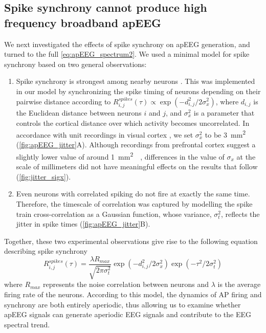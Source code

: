 \subsection{Spike synchrony cannot produce high frequency broadband apEEG}
We next investigated the effects of spike synchrony on apEEG generation, and turned to the full \ref{eq:apEEG_spectrum2}. We used a minimal model for spike synchrony based on two general observations:
\begin{enumerate}
\item Spike synchrony is strongest among nearby neurons \cite{Smith2008, Smith2013, Cohen2011}. This was implemented in our model by synchronizing the spike timing of neurons depending on their pairwise distance according to $R^{spikes}_{i,j}(\tau) \propto \exp(-d_{i,j}^2 / 2\sigma_x^2)$, where $d_{i,j}$ is the Euclidean distance between neurons $i$ and $j$, and $\sigma_x^2$ is a parameter that controls the cortical distance over which activity becomes uncorrelated. In accordance with unit recordings in visual cortex \cite{Smith2008, Smith2013}, we set $\sigma_x^2$ to be 3~\unit{\milli\meter^2}  ({\autoref{fig:apEEG_jitter}A}). Although recordings from prefrontal cortex suggest a slightly lower value of around 1~\unit{\milli\meter^2}~~\cite{Constantinidis2002},  differences in the value of $\sigma_x$ at the scale of millimeters did not have meaningful effects on the results that follow ({\autoref{fig:jitter_sigx}}).
\item Even neurons with correlated spiking do not fire at exactly the same time. Therefore, the timescale of correlation was captured by modelling the spike train cross-correlation as a Gaussian function, whose variance, $\sigma_t^2$, reflects the jitter in spike times  \cite{Bair2001, Smith2008, Smith2013, Cohen2011} ({\autoref{fig:apEEG_jitter}B}). 
\end{enumerate}
Together, these two experimental observations give rise to the following equation describing spike synchrony
\begin{equation} \label{eq:aperiodic_cross_correlation}
    R^{spikes}_{i,j}(\tau) = \frac{\lambda R_{max}}{\sqrt{2\pi \sigma_t^2}} \exp(-d_{i,j}^2 / 2\sigma_x^2) \exp(-\tau^2/2\sigma_t^2)
\end{equation} 
where $R_{max}$ represents the noise correlation between neurons \cite{Bair2001} and $\lambda$ is the average firing rate of the neurons. According to this model, the dynamics of AP firing and synchrony are both entirely aperiodic, thus allowing us to examine whether apEEG signals can generate aperiodic EEG signals and contribute to the EEG spectral trend.

